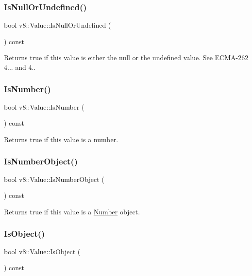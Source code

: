 \subsubsection{\texorpdfstring{Is\+Null\+Or\+Undefined()}{IsNullOrUndefined()}}
{\footnotesize\ttfamily bool v8\+::\+Value\+::\+Is\+Null\+Or\+Undefined (\begin{DoxyParamCaption}{ }\end{DoxyParamCaption}) const}

Returns true if this value is either the null or the undefined value. See E\+C\+M\+A-\/262 4... and 4.. \mbox{\label{classv8_1_1Value_a6ef42a28c0bc70022acb7e308bda4e19}} 
\subsubsection{\texorpdfstring{Is\+Number()}{IsNumber()}}
{\footnotesize\ttfamily bool v8\+::\+Value\+::\+Is\+Number (\begin{DoxyParamCaption}{ }\end{DoxyParamCaption}) const}

Returns true if this value is a number. \mbox{\label{classv8_1_1Value_a497018ef8c5ed946e1c0c30554bad3f8}} 
\subsubsection{\texorpdfstring{Is\+Number\+Object()}{IsNumberObject()}}
{\footnotesize\ttfamily bool v8\+::\+Value\+::\+Is\+Number\+Object (\begin{DoxyParamCaption}{ }\end{DoxyParamCaption}) const}

Returns true if this value is a \mbox{\hyperlink{classv8_1_1Number}{Number}} object. \mbox{\label{classv8_1_1Value_a72a01e06e897a8fedbb430cdd7fc3ffe}} 
\subsubsection{\texorpdfstring{Is\+Object()}{IsObject()}}
{\footnotesize\ttfamily bool v8\+::\+Value\+::\+Is\+Object (\begin{DoxyParamCaption}{ }\end{DoxyParamCaption}) const}


